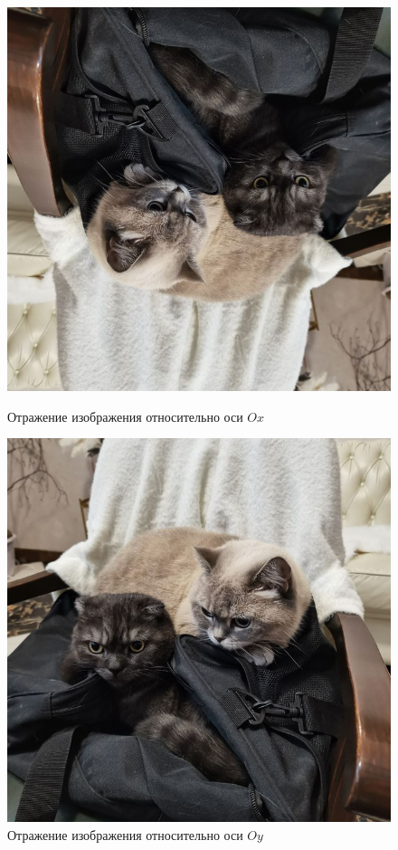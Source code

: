 \documentclass[a4paper, 16pt]{article}
\begin{document}
\begin{figure}[!htb]
    \centering
    \begin{minipage}{0.45\textwidth}
        \includegraphics[scale=0.3]{reflect_img_ox.png}
        \captionsetup{skip=0pt}
        \caption{Отражение изображения относительно оси $Ox$}
        \label{Рис:3}
    \end{minipage}\hfill
    \begin{minipage}{0.45\textwidth}
        \centering
        \includegraphics[scale=0.3]{reflect_img_oy.png}
        \captionsetup{skip=0pt}
        \caption{Отражение изображения относительно оси $Oy$}
        \label{Рис:4}
    \end{minipage}
\end{figure}
\end{document}
